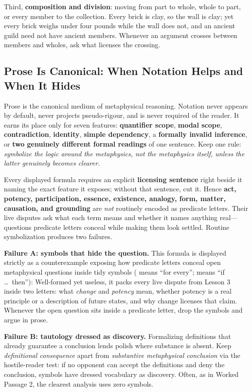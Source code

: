 Third, \textbf{composition and division}: moving from part to whole, whole to part, or every member to the collection. Every brick is clay, so the wall is clay; yet every brick weighs under four pounds while the wall does not, and an ancient guild need not have ancient members. Whenever an argument crosses between members and wholes, ask what licenses the crossing.

\subsection{Prose Is Canonical: When Notation Helps and When It Hides}

Prose is the canonical medium of metaphysical reasoning. Notation never appears by default, never projects pseudo-rigour, and is never required of the reader. It earns its place only for seven features: \textbf{quantifier scope}, \textbf{modal scope}, \textbf{contradiction}, \textbf{identity}, \textbf{simple dependency}, a \textbf{formally invalid inference}, or \textbf{two genuinely different formal readings} of one sentence. Keep one rule: \emph{symbolize the logic around the metaphysics, not the metaphysics itself, unless the latter genuinely becomes clearer.}

Every displayed formula requires an explicit \textbf{licensing sentence} right beside it naming the exact feature it exposes; without that sentence, cut it. Hence \textbf{act, potency, participation, essence, existence, analogy, form, matter, causation, and grounding} are \emph{not} routinely encoded as predicate letters. Their live disputes ask what each term means and whether it names anything real---questions predicate letters conceal while making them look settled. Routine symbolization produces two failures.

\textbf{Failure A: symbols that hide the question.} This formula is displayed strictly as a counterexample exposing how predicate letters conceal open metaphysical questions inside tidy symbols (\linline{\lall} means ``for every''; \linline{\limp} means ``if \dots\ then''):
Well-formed yet useless, it packs every live dispute from Lesson 3 inside two letters: what \emph{change} and \emph{potency} mean, whether potency is a real principle or a description of future states, and why change licenses that claim. Whenever the open question sits inside a predicate letter, drop the symbols and argue in prose.

\textbf{Failure B: tautology dressed as discovery.} Formalizing definitions that already guarantee a conclusion lends polish where substance is absent. Keep \emph{definitional consequence} apart from \emph{substantive metaphysical conclusion} via the hostile-reader test: if no opponent can accept the definitions and deny the conclusion, symbols have dressed vocabulary as discovery. Often, as in Worked Passage 2, the clearest analysis uses zero symbols.


